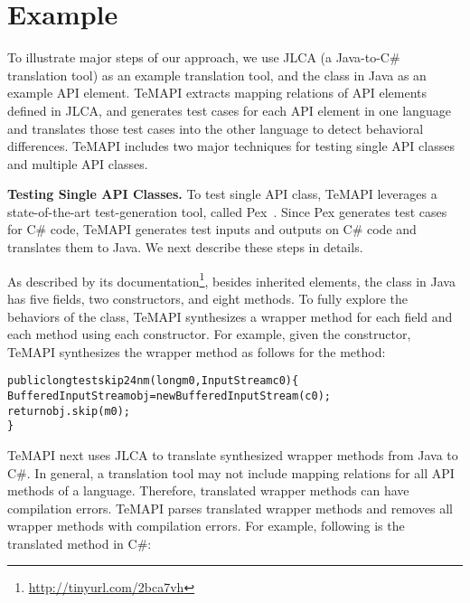 \section{Example}
\label{sec:example}

To illustrate major steps of our approach, we use JLCA (a Java-to-C\# translation tool) as an example translation tool, and the  class in Java as an example API element. TeMAPI extracts mapping relations of API elements defined in JLCA, and generates test cases for each API element in one language and translates those test cases into the other language to detect behavioral differences. TeMAPI includes two major techniques for testing single API classes and multiple API classes.

\textbf{Testing Single API Classes.} To test single API class, TeMAPI leverages a state-of-the-art test-generation tool, called Pex~\cite{tillmann2008pex}. Since Pex generates test cases for C\# code, TeMAPI generates test inputs and outputs on C\# code and translates them to Java. We next describe these steps in details.

As described by its documentation\footnote{\url{http://tinyurl.com/2bca7vh}}, besides inherited elements, the  class in Java has five fields, two constructors, and eight methods. To fully explore the behaviors of the class, TeMAPI synthesizes a wrapper method for each field and each method using each constructor. For example, given the  constructor, TeMAPI synthesizes the wrapper method as follows for the  method:

\begin{CodeOut}\vspace*{-1ex}
\begin{alltt}
public long testskip24nm(long m0,InputStream c0)\{
  BufferedInputStream obj = new BufferedInputStream(c0);
  return obj.skip(m0);
\}
\end{alltt}
\end{CodeOut}\vspace*{-2ex}

TeMAPI next uses JLCA to translate synthesized wrapper methods from Java to C\#. In general, a translation tool may not include mapping relations for all API methods of a language. Therefore, translated wrapper methods can have compilation errors. TeMAPI parses translated wrapper methods and removes all wrapper methods with compilation errors. For example, following is the translated  method in C\#:
\vspace*{-2ex}

